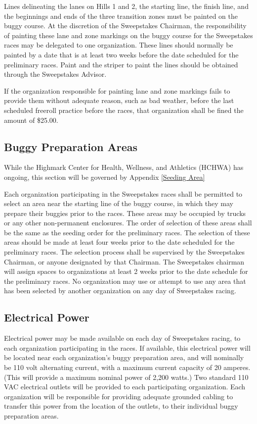 	Lines delineating the lanes on Hills 1 and 2, the starting line, the finish line, and the beginnings and ends of the three transition zones must be painted on the buggy course. At the discretion of the Sweepstakes Chairman, the responsibility of painting these lane and zone markings on the buggy course for the Sweepstakes races may be delegated to one organization. These lines should normally be painted by a date that is at least two weeks before the date scheduled for the preliminary races. Paint and the striper to paint the lines should be obtained through the Sweepstakes Advisor.

	If the organization responsible for painting lane and zone markings fails to provide them without adequate reason, such as bad weather, before the last scheduled freeroll practice before the races, that organization shall be fined the amount of \$25.00.

\subsection{Buggy Preparation Areas}

	While the Highmark Center for Health, Wellness, and Athletics (HCHWA) has ongoing, this section will be governed by Appendix \ref*{Seeding Area}

	Each organization participating in the Sweepstakes races shall be permitted to select an area near the starting line of the buggy course, in which they may prepare their buggies prior to the races. These areas may be occupied by trucks or any other non-permanent enclosures. The order of selection of these areas shall be the same as the seeding order for the preliminary races. The selection of these areas should be made at least four weeks prior to the date scheduled for the preliminary races. The selection process shall be supervised by the Sweepstakes Chairman, or anyone designated by that Chairman. The Sweepstakes chairman will assign spaces to organizations at least 2 weeks prior to the date schedule for the preliminary races. No organization may use or attempt to use any area that has been selected by another organization on any day of Sweepstakes racing.

\subsection{Electrical Power}

	Electrical power may be made available on each day of Sweepstakes racing, to each organization participating in the races. If available, this electrical power will be located near each organization's buggy preparation area, and will nominally be 110 volt alternating current, with a maximum current capacity of 20 amperes. (This will provide a maximum nominal power of 2,200 watts.) Two standard 110 VAC electrical outlets will be provided to each participating organization. Each organization will be responsible for providing adequate grounded cabling to transfer this power from the location of the outlets, to their individual buggy preparation areas.

